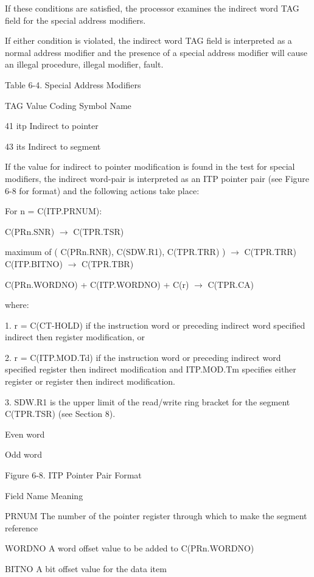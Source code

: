 If these conditions are satisfied, the processor examines the indirect word TAG
field for the special address modifiers.


If either condition is violated, the indirect word TAG field is interpreted as
a normal address modifier and the presence of a special address modifier will
cause an illegal procedure, illegal modifier, fault.

Table 6-4. Special Address Modifiers


TAG Value Coding Symbol Name 

41 itp Indirect to pointer

43 its Indirect to segment


If the value for indirect to pointer modification is found in the test for
special modifiers, the indirect word-pair is interpreted as an ITP pointer pair
(see Figure 6-8 for format) and the following actions take place:


For n = C(ITP.PRNUM):

C(PRn.SNR) $\rightarrow$ C(TPR.TSR)

maximum of ( C(PRn.RNR), C(SDW.R1), C(TPR.TRR) ) $\rightarrow$ C(TPR.TRR)
C(ITP.BITNO) $\rightarrow$ C(TPR.TBR)

C(PRn.WORDNO) + C(ITP.WORDNO) + C(r) $\rightarrow$ C(TPR.CA)

where:

1. r = C(CT-HOLD) if the instruction word or preceding indirect word specified 
indirect then register modification, or


2. r = C(ITP.MOD.Td) if the instruction word or preceding indirect word
specified register then indirect modification and ITP.MOD.Tm specifies either
register or register then indirect modification.

3. SDW.R1 is the upper limit of the read/write ring bracket for the segment
C(TPR.TSR) (see Section 8).


Even word

Odd word

Figure 6-8. ITP Pointer Pair Format


Field Name Meaning 

PRNUM The number of the pointer register through which to make the segment
reference

WORDNO A word offset value to be added to C(PRn.WORDNO)

BITNO A bit offset value for the data item 

